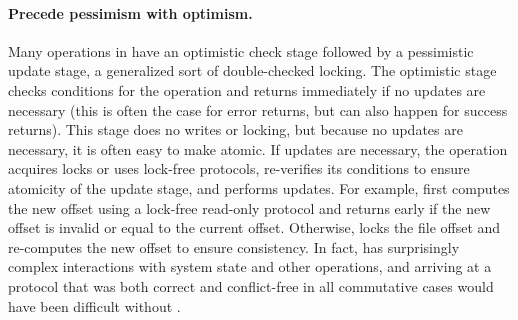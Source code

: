 



\paragraph{Precede pessimism with optimism.} Many operations
in \fs have an optimistic check stage followed by a pessimistic update
stage, a generalized sort of double-checked locking.  The optimistic
stage checks conditions for the operation and returns immediately if
no updates are necessary (this is often the case for error returns,
but can also happen for success returns).  This stage does no writes
or locking, but because no updates are necessary, it is often easy to
make atomic.  If updates are necessary, the operation acquires
locks or uses lock-free protocols, re-verifies its conditions to
ensure atomicity of the update stage, and performs updates.  For
example,  first computes the new offset using a lock-free
read-only protocol and returns early if the new offset is invalid or
equal to the current offset.  Otherwise,  locks the file
offset and re-computes the new offset to ensure consistency.
%
In fact,  has surprisingly complex interactions with
system state and other operations, and arriving at a protocol that was
both correct and conflict-free in all commutative cases would have
been difficult without \tool.

